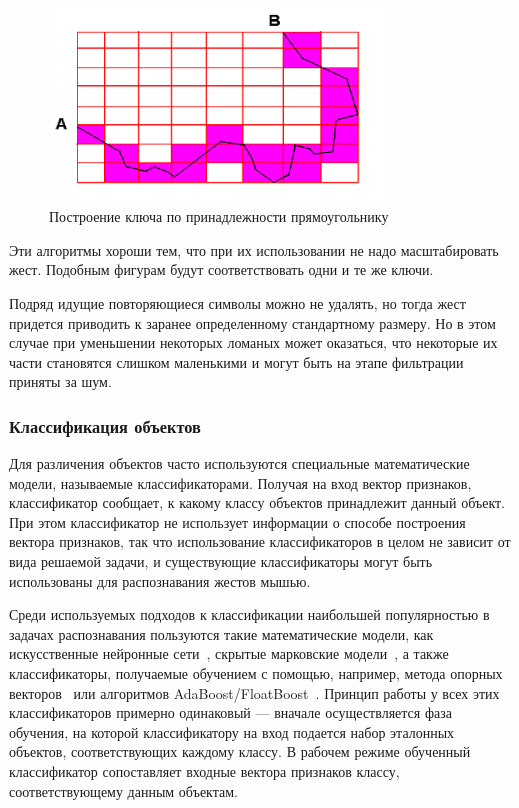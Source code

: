 \documentclass[a5paper]{article}
\begin{document}
\begin{figure} [ht]
  \begin{center}
    \includegraphics[width=0.8\textwidth, bb=0 0 544 390]{03-squares.png}
    \caption{Построение ключа по принадлежности прямоугольнику}
    \label{squares}
  \end{center}
\end{figure}

Эти алгоритмы хороши тем, что при их использовании не надо масштабировать жест. Подобным фигурам будут соответствовать одни и те же ключи.

Подряд идущие повторяющиеся символы можно не удалять, но тогда жест придется приводить к заранее определенному стандартному размеру. Но в этом случае при уменьшении некоторых ломаных может оказаться, что некоторые их части становятся слишком маленькими и могут быть на этапе фильтрации приняты за шум.

\subsubsection{Классификация объектов}
Для различения объектов часто используются специальные математические модели, называемые классификаторами. Получая на вход вектор признаков, классификатор сообщает, к какому классу объектов принадлежит данный объект. При этом классификатор не использует информации о способе построения вектора признаков, так что использование классификаторов в целом не зависит от вида решаемой задачи, и существующие классификаторы могут быть использованы для распознавания жестов мышью. 

Среди используемых подходов к классификации наибольшей популярностью в задачах распознавания пользуются такие математические модели, как искусственные нейронные сети~\cite{neuronet1, neuronet2, neuronet3}, скрытые марковские модели~\cite{hmm1, hmm2, hmm3}, а также классификаторы, получаемые обучением с помощью, например, метода опорных векторов~\cite{svm1, svm2} или алгоритмов AdaBoost/FloatBoost~\cite{boosting1, boosting2}. Принцип работы у всех этих классификаторов примерно одинаковый --- вначале осуществляется фаза обучения, на которой классификатору на вход подается набор эталонных объектов, соответствующих каждому классу. В рабочем режиме обученный классификатор сопоставляет входные вектора признаков классу, соответствующему данным объектам.
\end{document}
